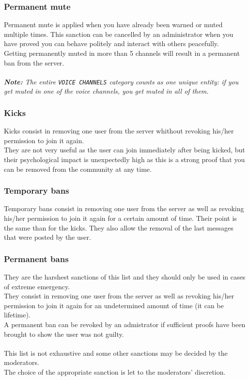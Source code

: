 \documentclass[a4paper]{article}
\begin{document}
\subsubsection{Permanent mute}
Permanent mute is applied when you have already been warned or muted multiple times. This sanction can be cancelled by an administrator when you have proved you can behave politely and interact with others peacefully.\\
Getting permanently muted in more than 5 channels will result in a permanent ban from the server.\\\\
\textsl{{\small \textbf{Note:} The entire \texttt{VOICE CHANNELS} category counts as one unique entity: if you get muted in one of the voice channels, you get muted in all of them.}}

\subsubsection{Kicks}
Kicks consist in removing one user from the server whithout revoking his/her permission to join it again.\\
They are not very useful as the user can join immediately after being kicked, but their psychological impact is unexpectedly high as this is a strong proof that you can be removed from the community at any time.

\subsubsection{Temporary bans}
Temporary bans consist in removing one user from the server as well as revoking his/her permission to join it again for a certain amount of time. Their point is the same than for the kicks. They also allow the removal of the last messages that were posted by the user.

\subsubsection{Permanent bans}
They are the harshest sanctions of this list and they should only be used in cases of extreme emergency.\\
They consist in removing one user from the server as well as revoking his/her permission to join it again for an undetermined amount of time (it can be lifetime).\\
A permanent ban can be revoked by an admistrator if sufficient proofs have been brought to show the user was not guilty.\\
\\
This list is not exhaustive and some other sanctions may be decided by the moderators.\\
The choice of the appropriate sanction is let to the moderators' discretion.
\end{document}
